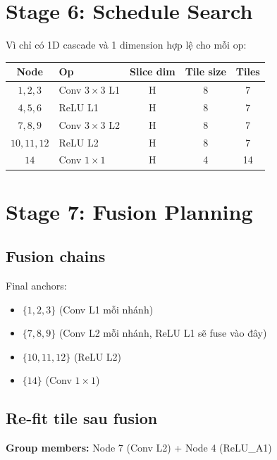 \documentclass[11pt,a4paper]{article}
\begin{document}
\section{Stage 6: Schedule Search}

Vì chỉ có 1D cascade và 1 dimension hợp lệ cho mỗi op:

\begin{table}[H]
\centering
\begin{tabular}{clccc}
\toprule
\textbf{Node} & \textbf{Op} & \textbf{Slice dim} & \textbf{Tile size} & \textbf{Tiles} \\
\midrule
$1, 2, 3$   & Conv $3\times 3$ L1 & H & 8 & 7 \\
$4, 5, 6$   & ReLU L1             & H & 8 & 7 \\
$7, 8, 9$   & Conv $3\times 3$ L2 & H & 8 & 7 \\
$10, 11, 12$ & ReLU L2             & H & 8 & 7 \\
$14$         & Conv $1\times 1$    & H & 4 & 14 \\
\bottomrule
\end{tabular}
\end{table}

\section{Stage 7: Fusion Planning}

\subsection{Fusion chains}
Final anchors:
\begin{itemize}
    \item $\{1, 2, 3\}$ (Conv L1 mỗi nhánh)
    \item $\{7, 8, 9\}$ (Conv L2 mỗi nhánh, ReLU L1 sẽ fuse vào đây)
    \item $\{10, 11, 12\}$ (ReLU L2)
    \item $\{14\}$ (Conv $1\times 1$)
\end{itemize}

\subsection{Re-fit tile sau fusion}
\textbf{Group members:}
Node 7 (Conv L2) + Node 4 (ReLU\_A1)
\end{document}

